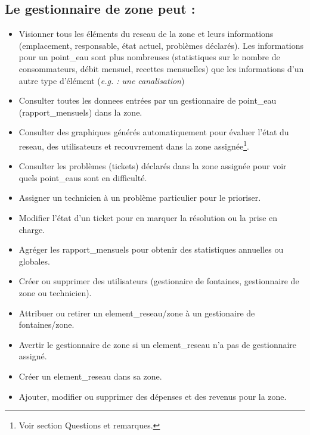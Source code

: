 \documentclass[a4paper, 11pt]{article}
\begin{document}

\subsection{Le gestionnaire de \gls{zone} peut :}
\begin{itemize}
  \item Visionner tous les éléments du \gls{reseau} de la \gls{zone} et leurs informations (emplacement, responsable, état actuel, problèmes déclarés). Les informations pour un \gls{point_eau} sont plus nombreuses (statistiques sur le nombre de consommateurs, débit mensuel, recettes mensuelles) que les informations d'un autre type d'élément (\emph{e.g. : une canalisation})
  \item Consulter toutes les \glspl{donnee} entrées par un gestionnaire de \gls{point_eau} (\glspl{rapport_mensuel}) dans la \gls{zone}.
  \item Consulter des graphiques générés automatiquement pour évaluer l'état du \gls{reseau}, des \glspl{utilisateur} et recouvrement dans la \gls{zone} assignée\footnote{Voir section Questions et remarques.}.
  \item Consulter les problèmes (\glspl{ticket}) déclarés dans la \gls{zone} assignée pour voir quels \glspl{point_eau} sont en difficulté.
  \item Assigner un technicien à un problème particulier pour le prioriser.
  \item Modifier l'état d'un \gls{ticket} pour en marquer la résolution ou la prise en charge.
  \item Agréger les \glspl{rapport_mensuel} pour obtenir des statistiques annuelles ou globales. %
  \item Créer ou supprimer des \glspl{utilisateur} (gestionaire de \glspl{fontaine}, gestionnaire de \gls{zone} ou technicien). %
  \item Attribuer ou retirer un \gls{element_reseau}/\gls{zone} à un gestionaire de \glspl{fontaine}/\gls{zone}.
  \item Avertir le gestionnaire de zone si un \gls{element_reseau} n'a pas de gestionnaire assigné.
  \item Créer un \gls{element_reseau} dans sa \gls{zone}.
  \item Ajouter, modifier ou supprimer des dépenses et des revenus pour la \gls{zone}.
\end{itemize}
\end{document}
